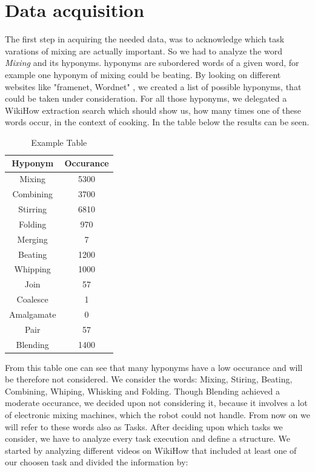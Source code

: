 \chapter*{Data acquisition}
	The first step in acquiring the needed data, was to acknowledge which task varations of mixing are actually important. So we had to analyze the word \textit{Mixing} and its hyponyms. 
	hyponyms are subordered words of a given word, for example one hyponym of mixing could be beating. By looking on different websites like "framenet, Wordnet" , we created a list of possible hyponyms, that could be taken under consideration.
	For all those hyponyms, we delegated a WikiHow extraction search which should show us, how many times one of these words occur, in the context of cooking.
	In the table below the results can be seen.
	
    \begin{table}[H]
        \centering
        \begin{tabular}{|c|c|}
          \hline
          \textbf{Hyponym} & \textbf{Occurance}  \\
          \hline
          Mixing & 5300 \\
          \hline
          Combining & 3700  \\
          \hline
          Stirring & 6810 \\
          \hline
          Folding & 970 \\
          \hline
          Merging & 7 \\
          \hline
          Beating & 1200 \\
          \hline
          Whipping & 1000 \\
          \hline
          Join & 57 \\
          \hline
          Coalesce & 1 \\
          \hline
          Amalgamate & 0 \\
          \hline
          Pair & 57 \\
          \hline
          Blending & 1400 \\
          \hline
    
        \end{tabular}
        \caption{Example Table}
        \label{tab:example}
      \end{table}
      

	From this table one can see that many hyponyms have a low occurance and will be therefore not considered.
	We consider the words: Mixing, Stiring, Beating, Combining, Whiping, Whisking and Folding. Though Blending achieved a moderate occurance, we decided upon not considering it, because it involves a lot of electronic mixing machines, which the robot could not handle.
	From now on we will refer to these words also as Tasks.
	After deciding upon which tasks we consider, we have to analyze every task execution and define a structure.
	We started by analyzing different videos on WikiHow that included at least one of our choosen task and divided the information by:
	
